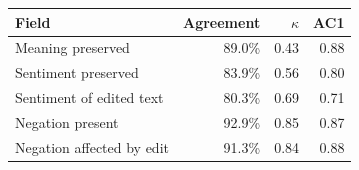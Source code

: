 \begin{tabular}{lrrr}
\toprule
Field & Agreement & $\kappa$ & AC1 \\
\midrule
Meaning preserved & 89.0\% & 0.43 & 0.88 \\
Sentiment preserved & 83.9\% & 0.56 & 0.80 \\
Sentiment of edited text & 80.3\% & 0.69 & 0.71 \\
Negation present & 92.9\% & 0.85 & 0.87 \\
Negation affected by edit & 91.3\% & 0.84 & 0.88 \\
\bottomrule
\end{tabular}
